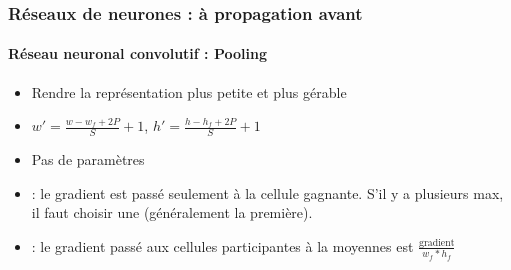 \documentclass[xcolor=table]{beamer}
\begin{document}
\begin{frame}
\frametitle{Réseaux de neurones : à propagation avant}
\framesubtitle{Réseau neuronal convolutif : Pooling}

\begin{minipage}{0.60\textwidth} 
	\begin{itemize}
		\item Rendre la représentation plus petite et plus gérable
		\item $ w' = \frac{w - w_f + 2P}{S} + 1$,  $ h' = \frac{h - h_f + 2P}{S} + 1$
		\item Pas de paramètres 
		\item {} : le gradient est passé seulement à la cellule gagnante. 
		S'il y a plusieurs max, il faut choisir une (généralement la première).
		\item {} : le gradient passé aux cellules participantes à la moyennes est $\frac{\text{gradient}}{w_f * h_f}$ 
	\end{itemize}
\end{minipage}
%
\begin{minipage}{0.39\textwidth}
	
\end{minipage}

\end{frame}
\end{document}
